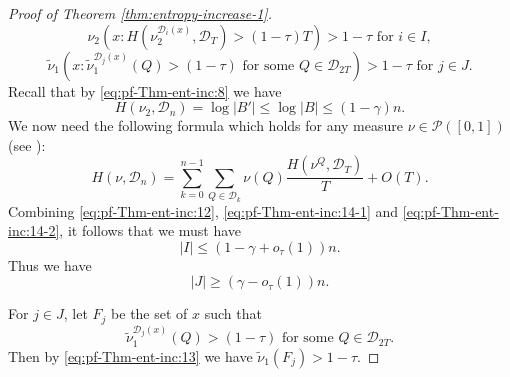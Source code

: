 \documentclass[a4paper,11pt]{amsart}
\theoremstyle{definition}
\numberwithin{equation}{section}
\def\D{\mathcal{D}}
\def\cP{\mathcal P}
\begin{document}
\begin{proof}[Proof of Theorem \ref{thm:entropy-increase-1}]
\begin{equation}\label{eq:pf-Thm-ent-inc:12}
\nu_2\left(x:H(\nu_2^{\D_i(x)},\D_T)>(1-\tau)T\right) >1-\tau \textrm{ for } i\in I,
\end{equation}
\begin{equation}\label{eq:pf-Thm-ent-inc:13}
\tilde{\nu}_1\left(x: \tilde{\nu}_1^{\D_j(x)}(Q)>(1-\tau) \textrm{ for some } Q\in \D_{2T} \right) >1-\tau \textrm{ for } j\in J.
\end{equation}
Recall that by \eqref{eq:pf-Thm-ent-inc:8} we have
\begin{equation}\label{eq:pf-Thm-ent-inc:14-1}
H(\nu_2,\D_n)=\log |B'|\le \log |B|\le (1-\gamma)n. 
\end{equation}
We now need  the following formula  which holds for any measure $\nu\in \cP([0,1])$ (see \cite[Lemma 3.4]{Hochman2014}):
\begin{equation}\label{eq:pf-Thm-ent-inc:14-2}
H(\nu,\D_n)=\sum_{k=0}^{n-1}\sum_{Q\in \D_k}\nu(Q)\frac{H(\nu^Q,\D_T)}{T} +O(T).
\end{equation}
Combining \eqref{eq:pf-Thm-ent-inc:12},  \eqref{eq:pf-Thm-ent-inc:14-1} and \eqref{eq:pf-Thm-ent-inc:14-2}, it follows that 
we must have
\[
|I|\le (1-\gamma+o_\tau(1))n.
\]
Thus we have
\begin{equation}\label{eq:pf-Thm-ent-inc:15}
|J| \ge (\gamma-o_\tau(1))n.
\end{equation}

{\color{black}
For $j\in J$,  let $F_j$ be the set of $x$ such that 
\begin{equation}\label{eq:pf-Thm-ent-inc:16*}
\tilde{\nu}_1^{\D_j(x)}(Q)>(1-\tau) \textrm{ for some } Q\in \D_{2T} .
\end{equation}
Then by \eqref{eq:pf-Thm-ent-inc:13} we have $\tilde{\nu}_1(F_j)>1-\tau.$  

}
\end{proof}
\end{document}
